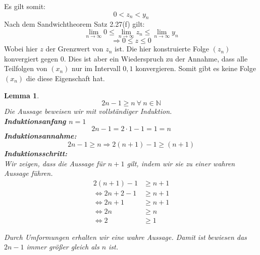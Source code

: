 \documentclass{article}
\begin{document}
\begin{enumerate}[ label = (\roman*)]
            Es gilt somit:
            \[ 0 < z_n < y_n \]
            Nach dem Sandwichtheorem Satz 2.27(f) gilt:
            \[ \lim_{n \to \infty} 0 \leq \lim_{n \to \infty} z_n \leq \lim_{n \to \infty} y_n \]
            \[ \Rightarrow 0 \leq z \leq 0\]
            Wobei hier \(z\) der Grenzwert von \(z_n\) ist. Die hier konstruierte Folge \((z_n)\) konvergiert gegen 0. Dies ist aber ein Wiederspruch zu der Annahme,
            dass alle Teilfolgen von \((x_n)\) nur im Intervall \(0, 1\) konvergieren.
            Somit gibt es keine Folge \((x_n)\) die diese Eigenschaft hat.

        \end{enumerate}

    \newtheorem{lemma1}[lemma_counter]{Lemma}
    \begin{lemma1}
        \[ 2n -1 \geq n \: \forall \: n \in \mathbb{N} \]
        Die Aussage beweisen wir mit vollständiger Induktion. \\
        \textbf{Induktionsanfang \(n=1\)}
        \[2n - 1 = 2 \cdot 1 - 1 = 1 = n\]
        \textbf{Induktionsannahme:}
        \[2n - 1 \geq n \Rightarrow 2(n+1) -1 \geq (n+1)\]
        \textbf{Induktionsschritt:} \\
        Wir zeigen, dass die Aussage für \(n+1\) gilt, indem wir sie zu einer wahren Aussage führen.
        \begin{align*}
            2 (n+1) - 1 & \geq n + 1 \\
            \Leftrightarrow 2n + 2 - 1 & \geq n + 1 \\
            \Leftrightarrow 2n + 1 & \geq n + 1 \\
            \Leftrightarrow 2n & \geq n \\
            \Leftrightarrow 2 & \geq 1 
        \end{align*}
   
        Durch Umformungen erhalten wir eine wahre Aussage. Damit ist bewiesen das \(2n - 1\) immer größer gleich als \(n\) ist.
    \end{lemma1}
\end{document}
